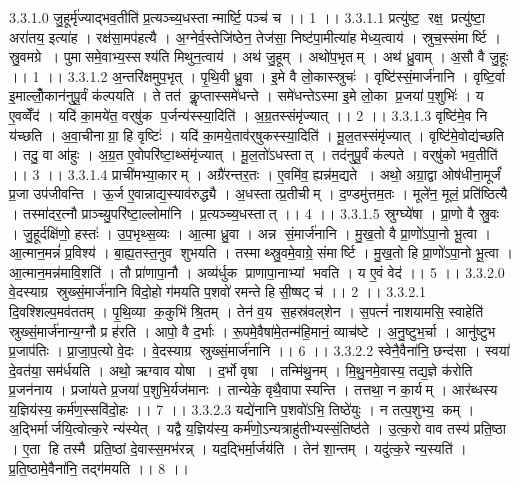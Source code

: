 3.3.1.0
जु॒हूर्मृ॑ज्याद्भव॒तीति॑ प्र॒त्यञ्च्य॒धस्तान्मार्ष्टि॒ पञ्च॑ च ।। 1 ।।
3.3.1.1
प्रत्यु॑ष्ट॒॒ रक्ष॒ प्रत्यु॑ष्टा॒ अरा॑तय॒ इत्या॑ह । रक्ष॑सा॒मप॑हत्यै । अ॒ग्नेर्व॒स्तेजि॑ष्ठेन॒ तेज॑सा॒ निष्ट॑पा॒मीत्या॑ह मेध्य॒त्वाय॑ । स्रुच॒स्संमार्ष्टि । स्रु॒वमग्रे । पुमा॑समे॒वाभ्य॒स्सश्य॑ति मिथुन॒त्वाय॑ । अथ॑ जु॒हूम् । अथो॑प॒भृतम् । अथ॑ ध्रु॒वाम् । अ॒सौ वै जु॒हूः ।। 1 ।।
3.3.1.2
अ॒न्तरि॑क्षमुप॒भृत् । पृ॒थि॒वी ध्रु॒वा । इ॒मे वै लो॒कास्स्रुचः॑ । वृष्टि॑स्सं॒मार्ज॑नानि । वृष्टि॒र्वा इ॒माल्लोँ॒कान॑नुपू॒र्वं क॑ल्पयति । ते तत॑ कॢ॒प्तास्समे॑धन्ते । समे॑धन्तेऽस्मा इ॒मे लो॒का प्र॒जया॑ प॒शुभिः॑ । य ए॒वव्वेँद॑ । यदि॑ का॒मये॑त॒ वर्‌षु॑क प॒र्जन्य॑स्स्या॒दिति॑ । अ॒ग्र॒तस्संमृ॑ज्यात् ।। 2 ।।
3.3.1.3
वृष्टि॑मे॒व नि य॑च्छति । अ॒वा॒चीनाग्रा॒ हि वृष्टिः॑ । यदि॑ का॒मये॒ताव॑र्‌षुकस्स्या॒दिति॑ । मू॒ल॒तस्संमृ॑ज्यात् । वृष्टि॑मे॒वोद्य॑च्छति । तदु॒ वा आ॑हुः । अ॒ग्र॒त ए॒वोपरि॑ष्टा॒थ्संमृ॑ज्यात् । मू॒ल॒तो॑ऽधस्तात् । तद॑नुपू॒र्वं क॑ल्पते । वर्‌षु॑को भव॒तीति॑ ।। 3 ।।
3.3.1.4
प्राची॑मभ्या॒कारम् । अग्रै॑रन्तर॒तः । ए॒वमि॑व॒ ह्यन्न॑म॒द्यते । अथो॒ अग्रा॒द्वा ओष॑धीना॒मूर्जं॑ प्र॒जा उप॑जीवन्ति । ऊ॒र्ज ए॒वान्नाद्य॒स्याव॑रुद्ध्यै । अ॒धस्तात्प्र॒तीचीम् । द॒ण्डमु॑त्तम॒तः । मूले॑न॒ मूलं॒ प्रति॑ष्ठित्यै । तस्मा॑दर॒त्नौ प्राञ्च्यु॒परि॑ष्टा॒ल्लोमा॑नि । प्र॒त्यञ्च्य॒धस्तात् ।। 4 ।।
3.3.1.5
स्रुग्घ्ये॑षा । प्रा॒णो वै स्रु॒वः । जु॒हूर्दक्षि॑णो॒ हस्तः॑ । उ॒प॒भृथ्स॒व्यः । आ॒त्मा ध्रु॒वा । अन्न॑ सं॒मार्ज॑नानि । मु॒ख॒तो वै प्रा॒णो॑ऽपा॒नो भू॒त्वा । आ॒त्मान॒मन्नं॑ प्र॒विश्य॑ । बा॒ह्य॒तस्त॒नुव॑ शुभयति । तस्माथ्स्रु॒वमे॒वाग्रे॒ संमार्ष्टि । मु॒ख॒तो हि प्रा॒णो॑ऽपा॒नो भू॒त्वा । आ॒त्मान॒मन्न॑मावि॒शति॑ । तौ प्रा॑णापा॒नौ । अव्य॑र्धुक प्राणापा॒नाभ्यां भवति । य ए॒वं वेद॑ ।। 5 ।।
3.3.2.0
वे॒दस्याग्र॑ स्रुख्सं॒मार्ज॑नानि विदो॒हो ग॑मयति प॒शवो॑ रमन्ते हिसी॒ष्षट् च॑ ।। 2 ।।
3.3.2.1
दि॒वश्शिल्प॒मव॑ततम् । पृ॒थि॒व्या क॒कुभि॑ श्रि॒तम् । तेन॑ व॒य स॒हस्र॑वल्‌शेन । स॒पत्नं॑ नाशयामसि॒ स्वाहेति॑ स्रुख्सं॒मार्ज॑नान्य॒ग्नौ प्र ह॑रति । आपो॒ वै द॒र्भाः । रू॒पमे॒वैषा॑मे॒तन्म॑हि॒मानं॒ व्याच॑ष्टे । अ॒नु॒ष्टुभ॒र्चा । आनु॑ष्टुभ प्र॒जाप॑तिः । प्रा॒जा॒प॒त्यो वे॒दः । वे॒दस्याग्र॑ स्रुख्सं॒मार्ज॑नानि ।। 6 ।।
3.3.2.2
स्वेनै॒वैना॑नि॒ छन्द॑सा । स्वया॑ दे॒वत॑या॒ सम॑र्धयति । अथो॒ ऋग्वाव योषा । द॒र्भो वृषा । तन्मि॑थु॒नम् । मि॒थु॒नमे॒वास्य॒ तद्य॒ज्ञे क॑रोति प्र॒जन॑नाय । प्रजा॑यते प्र॒जया॑ प॒शुभि॒र्यज॑मानः । तान्येके॒ वृथै॒वापास्यन्ति । तत्तथा॒ न का॒र्यम् । आर॑ब्धस्य य॒ज्ञिय॑स्य॒ कर्म॑ण॒स्सवि॑दो॒हः ।। 7 ।।
3.3.2.3
यद्ये॑नानि प॒शवो॑ऽभि॒ तिष्ठे॑युः । न तत्प॒शुभ्य॒ कम् । अ॒द्भिर्मार्जयि॒त्वोत्क॒रे न्य॑स्येत् । यद्वै य॒ज्ञिय॑स्य॒ कर्म॑णो॒ऽन्यत्राहु॑तीभ्यस्सं॒तिष्ठ॑ते । उ॒त्क॒रो वाव तस्य॑ प्रति॒ष्ठा । ए॒ता हि तस्मै प्रति॒ष्ठां दे॒वास्स॒मभ॑रन्न् । यद॒द्भिर्मा॒र्जय॑ति । तेन॑ शा॒न्तम् । यदु॑त्क॒रे न्य॒स्यति॑ । प्र॒ति॒ष्ठामे॒वैना॑नि॒ तद्ग॑मयति ।। 8 ।।
